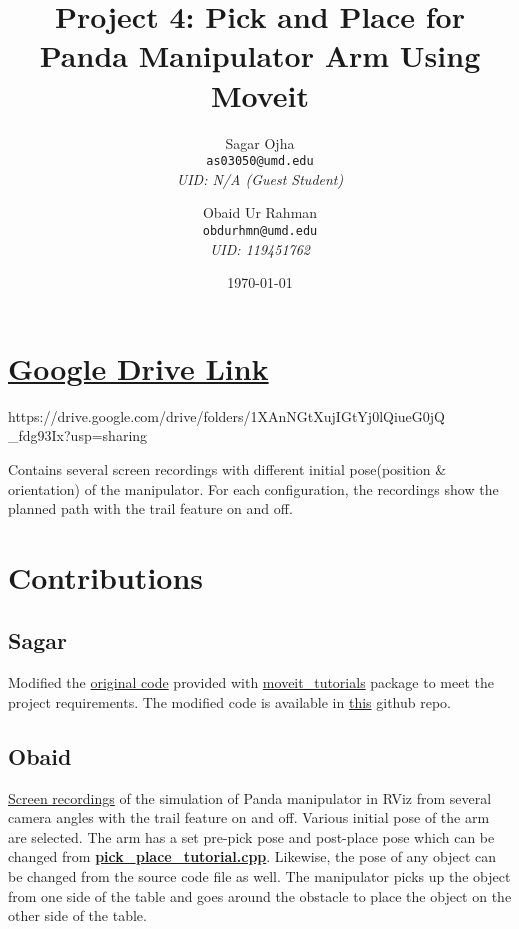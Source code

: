 \documentclass[12pt]{extarticle}
\title{Project 4: Pick and Place for Panda Manipulator Arm Using Moveit}
\author{
	Sagar Ojha \\
	\texttt{as03050@umd.edu}\\
	\textit{UID: N/A (Guest Student)}
	\and
	Obaid Ur Rahman\\
	\texttt{obdurhmn@umd.edu}\\
	\textit{UID: 119451762}}
\date{\today}
\begin{document}
\maketitle
\newpage
\section{\href{https://drive.google.com/drive/folders/1XAnNGtXujIGtYj0lQiueG0jQ_fdg93Ix?usp=sharing}{Google Drive Link}}
\hspace{\parindent} https://drive.google.com/drive/folders/1XAnNGtXujIGtYj0lQiueG0jQ
\_fdg93Ix?usp=sharing

Contains several screen recordings with different initial pose(position \& orientation) of the manipulator. For each configuration, the recordings show the planned path with the trail feature on and off.

\section{Contributions}
\subsection{Sagar}
\hspace{\parindent} Modified the \href{https://github.com/ros-planning/moveit_tutorials/blob/master/doc/pick_place/src/pick_place_tutorial.cpp}{original code} provided with \href{https://ros-planning.github.io/moveit_tutorials/doc/getting_started/getting_started.html}{moveit\_tutorials} package to meet the project requirements. The modified code is available in \href{https://github.com/Sagar-Ojha/ENPM-661/tree/main/Project4}{this} github repo.

\subsection{Obaid}
\hspace{\parindent} \href{https://drive.google.com/drive/folders/1XAnNGtXujIGtYj0lQiueG0jQ_fdg93Ix?usp=sharing}{Screen recordings} of the simulation of Panda manipulator in RViz from several camera angles with the trail feature on and off. Various initial pose of the arm are selected. The arm has a set pre-pick pose and post-place pose which can be changed from \href{https://github.com/Sagar-Ojha/ENPM-661/tree/main/Project4}{\textbf{pick\_place\_tutorial.cpp}}. Likewise, the pose of any object can be changed from the source code file as well. The manipulator picks up the object from one side of the table and goes around the obstacle to place the object on the other side of the table.
\end{document}
